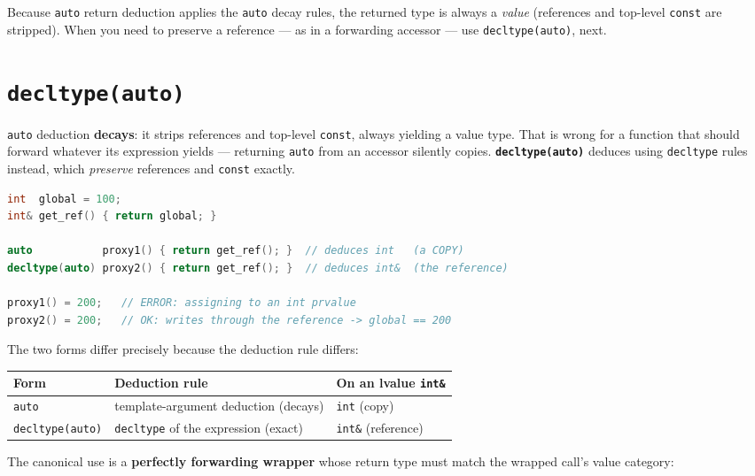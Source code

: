 Because \texttt{auto} return deduction applies the \texttt{auto} decay rules, the returned type is always a \emph{value} (references and top-level \texttt{const} are stripped). When you need to preserve a reference --- as in a forwarding accessor --- use \texttt{decltype(auto)}, next.

\section{\texttt{decltype(auto)}}
\label{sec:c14-decltype-auto}

\texttt{auto} deduction \textbf{decays}: it strips references and top-level \texttt{const}, always yielding a value type. That is wrong for a function that should forward whatever its expression yields --- returning \texttt{auto} from an accessor silently copies. \textbf{\texttt{decltype(auto)}} deduces using \texttt{decltype} rules instead, which \emph{preserve} references and \texttt{const} exactly.

\begin{lstlisting}[language=C++,caption={auto decays; decltype(auto) preserves}]
int  global = 100;
int& get_ref() { return global; }

auto           proxy1() { return get_ref(); }  // deduces int   (a COPY)
decltype(auto) proxy2() { return get_ref(); }  // deduces int&  (the reference)

proxy1() = 200;   // ERROR: assigning to an int prvalue
proxy2() = 200;   // OK: writes through the reference -> global == 200
\end{lstlisting}

The two forms differ precisely because the deduction rule differs:

\begin{center}
\begin{tabular}{lll}
\hline
\textbf{Form} & \textbf{Deduction rule} & \textbf{On an lvalue \texttt{int\&}} \\
\hline
\texttt{auto} & template-argument deduction (decays) & \texttt{int} (copy) \\
\texttt{decltype(auto)} & \texttt{decltype} of the expression (exact) & \texttt{int\&} (reference) \\
\hline
\end{tabular}
\end{center}

The canonical use is a \textbf{perfectly forwarding wrapper} whose return type must match the wrapped call's value category:


